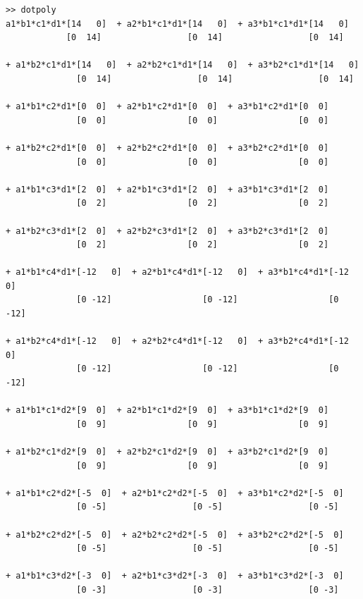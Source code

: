 \documentclass[english,11pt]{article}
\theoremstyle{break} \theorembodyfont{\small\rm}
\begin{document}
\begin{minipage}{17.2cm}
\begin{lstlisting}[rulecolor=\color{red}]
>> dotpoly
a1*b1*c1*d1*[14   0]  + a2*b1*c1*d1*[14   0]  + a3*b1*c1*d1*[14   0]  
            [0  14]                 [0  14]                 [0  14]   

+ a1*b2*c1*d1*[14   0]  + a2*b2*c1*d1*[14   0]  + a3*b2*c1*d1*[14   0]  
              [0  14]                 [0  14]                 [0  14]   
              
+ a1*b1*c2*d1*[0  0]  + a2*b1*c2*d1*[0  0]  + a3*b1*c2*d1*[0  0]  
              [0  0]                [0  0]                [0  0]  
              
+ a1*b2*c2*d1*[0  0]  + a2*b2*c2*d1*[0  0]  + a3*b2*c2*d1*[0  0]  
              [0  0]                [0  0]                [0  0]  
              
+ a1*b1*c3*d1*[2  0]  + a2*b1*c3*d1*[2  0]  + a3*b1*c3*d1*[2  0]  
              [0  2]                [0  2]                [0  2]  
              
+ a1*b2*c3*d1*[2  0]  + a2*b2*c3*d1*[2  0]  + a3*b2*c3*d1*[2  0]  
              [0  2]                [0  2]                [0  2]  
              
+ a1*b1*c4*d1*[-12   0]  + a2*b1*c4*d1*[-12   0]  + a3*b1*c4*d1*[-12   0]  
              [0 -12]                  [0 -12]                  [0 -12]    
              
+ a1*b2*c4*d1*[-12   0]  + a2*b2*c4*d1*[-12   0]  + a3*b2*c4*d1*[-12   0]  
              [0 -12]                  [0 -12]                  [0 -12]    
              
+ a1*b1*c1*d2*[9  0]  + a2*b1*c1*d2*[9  0]  + a3*b1*c1*d2*[9  0]  
              [0  9]                [0  9]                [0  9]  
              
+ a1*b2*c1*d2*[9  0]  + a2*b2*c1*d2*[9  0]  + a3*b2*c1*d2*[9  0]  
              [0  9]                [0  9]                [0  9]  
              
+ a1*b1*c2*d2*[-5  0]  + a2*b1*c2*d2*[-5  0]  + a3*b1*c2*d2*[-5  0]  
              [0 -5]                 [0 -5]                 [0 -5]   
              
+ a1*b2*c2*d2*[-5  0]  + a2*b2*c2*d2*[-5  0]  + a3*b2*c2*d2*[-5  0]  
              [0 -5]                 [0 -5]                 [0 -5]   
              
+ a1*b1*c3*d2*[-3  0]  + a2*b1*c3*d2*[-3  0]  + a3*b1*c3*d2*[-3  0]  
              [0 -3]                 [0 -3]                 [0 -3]   
              

\end{lstlisting}
\end{minipage}
\end{document}
